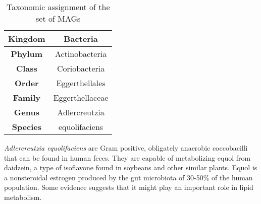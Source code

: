 \begin{table}[h]
\centering
\begin{tabular}{|c|c|}
    \hline
    \textbf{Kingdom} & Bacteria \\
    \hline
    \textbf{Phylum} & Actinobacteria \\
    \hline
    \textbf{Class} & Coriobacteria \\
    \hline
    \textbf{Order} & Eggerthellales \\
    \hline
    \textbf{Family} & Eggerthellaceae \\
    \hline
    \textbf{Genus} & Adlercreutzia \\
    \hline
    \textbf{Species} & equolifaciens \\
    \hline
\end{tabular}
\caption{\footnotesize{Taxonomic assignment of the set of MAGs}}
\label{tab:taxonomy}
\end{table}

\textit{Adlercreutzia equolifaciens} are Gram positive, obligately anaerobic coccobacilli that can be found in human feces. They are capable of metabolizing equol from daidzein, a type of isoflavone found in soybeans and other similar plants\cite{Adlercreutzia}. Equol is a nonsteroidal estrogen produced by the gut microbiota of 30-50\% of the human population. Some evidence suggests that it might play an important role in lipid metabolism\cite{equol}.